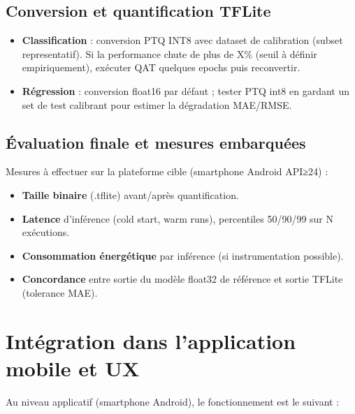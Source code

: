 \subsection{Conversion et quantification TFLite}

\begin{itemize}
	\item \textbf{Classification} : conversion PTQ INT8 avec dataset de calibration (subset representatif). Si la performance chute de plus de X\% (seuil à définir empiriquement), exécuter QAT quelques epochs puis reconvertir.
	\item \textbf{Régression} : conversion float16 par défaut ; tester PTQ int8 en gardant un set de test calibrant pour estimer la dégradation MAE/RMSE.
\end{itemize}

\subsection{Évaluation finale et mesures embarquées}

Mesures à effectuer sur la plateforme cible (smartphone Android API≥24) :
\begin{itemize}
	\item \textbf{Taille binaire} (.tflite) avant/après quantification.
	\item \textbf{Latence} d'inférence (cold start, warm runs), percentiles 50/90/99 sur N exécutions.
	\item \textbf{Consommation énergétique} par inférence (si instrumentation possible).
	\item \textbf{Concordance} entre sortie du modèle float32 de référence et sortie TFLite (tolerance MAE).
\end{itemize}

\section{Intégration dans l'application mobile et UX}

Au niveau applicatif (smartphone Android), le fonctionnement est le suivant :

